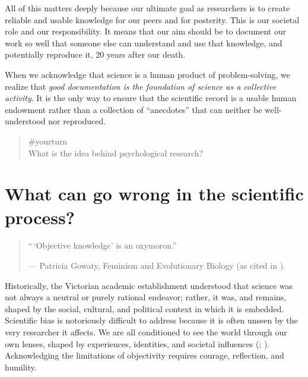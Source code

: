\documentclass[
  letterpaper,
]{book}
\begin{document}
All of this matters deeply because our ultimate goal as researchers is
to create reliable and usable knowledge for our peers and for posterity.
This is our societal role and our responsibility. It means that our aim
should be to document our work so well that someone else can understand
and use that knowledge, and potentially reproduce it, 20 years after our
death.

When we acknowledge that science is a human product of problem-solving,
we realize that \emph{good documentation is the foundation of science as
a collective activity}. It is the only way to ensure that the scientific
record is a usable human endowment rather than a collection of
``anecdotes'' that can neither be well-understood nor reproduced.

\begin{quote}
{\#yourturn}\\
What is the idea behind psychological research?
\end{quote}

\section*{What can go wrong in the scientific
process?}\label{what-can-go-wrong-in-the-scientific-process}


\begin{quote}
``\,`Objective knowledge' is an oxymoron.''

--- Patricia Gowaty, Feminism and Evolutionary Biology (as cited in
).
\end{quote}

Historically, the Victorian academic establishment understood that
science was not always a neutral or purely rational endeavor; rather, it
was, and remains, shaped by the social, cultural, and political context
in which it is embedded. Scientific bias is notoriously difficult to
address because it is often unseen by the very researcher it affects. We
are all conditioned to see the world through our own lenses, shaped by
experiences, identities, and societal influences
(;
).
Acknowledging the limitations of objectivity requires courage,
reflection, and humility.
\end{document}
